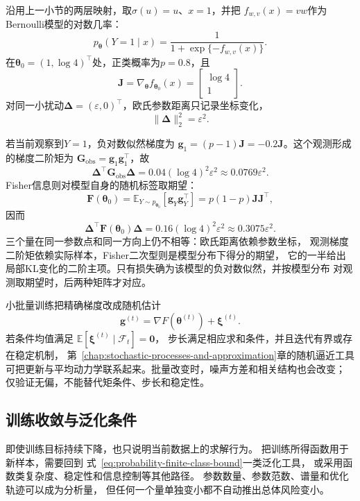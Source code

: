 \begin{example}[同一参数点上的三种二次量]
  \label{ex:future-parameter-second-moment-fisher}
  沿用上一小节的两层映射，取\(\sigma(u)=u\)、\(x=1\)，并把
  \(f_{w,v}(x)=vw\)作为Bernoulli模型的对数几率：
  \[
    p_{\bm\theta}(Y=1\mid x)
    =
    \frac{1}{1+\exp\{-f_{w,v}(x)\}}.
  \]
  在\(\bm\theta_0=(1,\log4)^{\top}\)处，正类概率为\(p=0.8\)，且
  \[
    \bm J
    =
    \nabla_{\bm\theta}f_{\bm\theta_0}(x)
    =
    \begin{bmatrix}\log4\\1\end{bmatrix}.
  \]
  对同一小扰动\(\bm\Delta=(\varepsilon,0)^{\top}\)，欧氏参数距离只记录坐标变化，
  \[
    \lVert\bm\Delta\rVert_2^2=\varepsilon^2.
  \]

  若当前观察到\(Y=1\)，负对数似然梯度为
  \(\bm g_1=(p-1)\bm J=-0.2\bm J\)。这个观测形成的梯度二阶矩为
  \(\bm G_{\mathrm{obs}}=\bm g_1\bm g_1^{\top}\)，故
  \[
    \bm\Delta^{\top}\bm G_{\mathrm{obs}}\bm\Delta
    =
    0.04(\log4)^2\varepsilon^2
    \approx0.0769\varepsilon^2.
  \]
  Fisher信息则对模型自身的随机标签取期望：
  \[
    \bm F(\bm\theta_0)
    =
    \mathbb{E}_{Y\sim p_{\bm\theta_0}}
    [\bm g_Y\bm g_Y^{\top}]
    =
    p(1-p)\bm J\bm J^{\top},
  \]
  因而
  \[
    \bm\Delta^{\top}\bm F(\bm\theta_0)\bm\Delta
    =
    0.16(\log4)^2\varepsilon^2
    \approx0.3075\varepsilon^2.
  \]
  三个量在同一参数点和同一方向上仍不相等：欧氏距离依赖参数坐标，
  观测梯度二阶矩依赖实际样本，Fisher二次型则是模型分布下得分的期望，
  它的一半给出局部KL变化的二阶主项。只有损失确为该模型的负对数似然，并按模型分布
  对观测取期望时，后两种矩阵才对应。
\end{example}

小批量训练把精确梯度改成随机估计
\[
  \bm{g}^{(t)}
  =
  \nabla F(\bm{\theta}^{(t)})
  +
  \bm{\xi}^{(t)}.
\]
若条件均值满足
$\mathbb{E}[\bm{\xi}^{(t)}\mid\mathcal{F}_t]=\bm{0}$，
步长满足相应求和条件，并且迭代有界或存在稳定机制，
第~\ref{chap:stochastic-processes-and-approximation}章的随机逼近工具
可把更新与平均动力学联系起来。批量改变时，噪声方差和相关结构也会改变；
仅验证无偏，不能替代矩条件、步长和稳定性。

\subsection{训练收敛与泛化条件}
\label{sec:future-training-convergence-generalization}

即使训练目标持续下降，也只说明当前数据上的求解行为。
把训练所得函数用于新样本，需要回到
式~\eqref{eq:probability-finite-class-bound}一类泛化工具，
或采用函数类复杂度、稳定性和信息控制等其他路径。
参数数量、参数范数、谱量和优化轨迹可以成为分析量，
但任何一个量单独变小都不自动推出总体风险变小。

